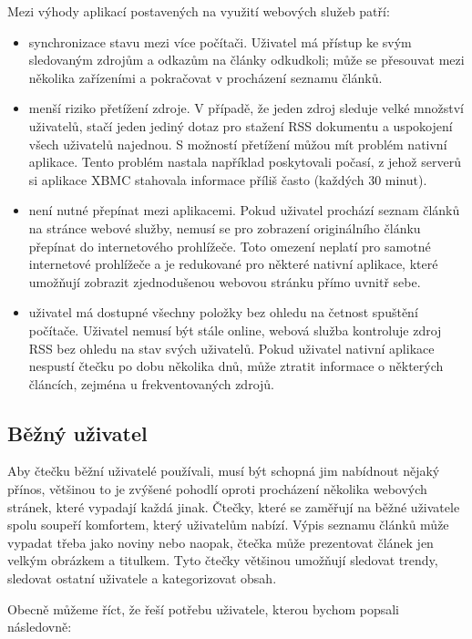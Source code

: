 Mezi výhody aplikací postavených na využití webových služeb patří:
\begin{itemize}
    \item synchronizace stavu mezi více počítači.
        Uživatel má přístup ke svým sledovaným zdrojům a odkazům na články odkudkoli; může se přesouvat mezi několika zařízeními a pokračovat v procházení seznamu článků.
    \item menší riziko přetížení zdroje.
        V případě, že jeden zdroj sleduje velké množství uživatelů, stačí jeden jediný dotaz pro stažení RSS dokumentu a uspokojení všech uživatelů najednou.
        S možností přetížení můžou mít problém nativní aplikace.
		Tento problém nastala například poskytovali počasí, z jehož serverů si aplikace XBMC stahovala informace příliš často (každých 30 minut).
    \item není nutné přepínat mezi aplikacemi.
        Pokud uživatel prochází seznam člán\-ků na stránce webové služby, nemusí se pro zobrazení originálního článku přepínat do internetového prohlížeče.
        Toto omezení neplatí pro samotné internetové prohlížeče a je redukované pro některé nativní aplikace, které umožňují zobrazit zjednodušenou webovou stránku přímo uvnitř sebe.
    \item uživatel má dostupné všechny položky bez ohledu na četnost spuštění počítače.
        Uživatel nemusí být stále online, webová služba kontroluje zdroj RSS bez ohledu na stav svých uživatelů.
        Pokud uživatel nativní aplikace nespustí čtečku po dobu několika dnů, může ztratit informace o některých článcích, zejména u frekventovaných zdrojů.
\end{itemize}

\subsection{Běžný uživatel}

Aby čtečku běžní uživatelé používali, musí být schopná jim nabídnout nějaký přínos, většinou to je zvýšené pohodlí oproti procházení několika webových stránek, které vypadají každá jinak.
Čtečky, které se zaměřují na běžné uživatele spolu soupeří komfortem, který uživatelům nabízí.
Výpis seznamu článků může vypadat třeba jako noviny nebo naopak, čtečka může prezentovat článek jen velkým obrázkem a titulkem.
Tyto čtečky většinou umožňují sledovat trendy, sledovat ostatní uživatele a kategorizovat obsah.

Obecně můžeme říct, že řeší potřebu uživatele, kterou bychom popsali následovně:

